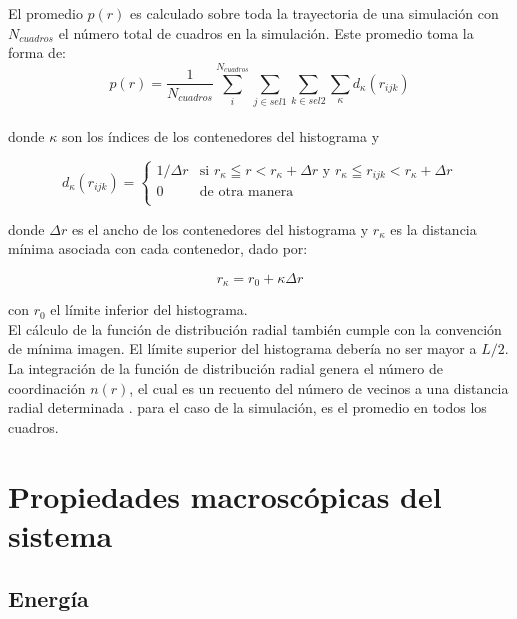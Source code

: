 El promedio $p(r)$ es calculado sobre toda la trayectoria de una simulación con $N_{cuadros}$ el número total de cuadros en la simulación. Este promedio toma la forma de:\\

\begin{equation}\label{p}
    p(r)=\frac{1}{N_{cuadros}}\sum^{N_{cuadros}}_i \sum_{j\in sel1} \sum_{k\in sel2} \sum_{\kappa} d_{\kappa}(r_{ijk})
\end{equation}\\

donde $\kappa$ son los índices de los contenedores del histograma y

\begin{equation}
    d_{\kappa}(r_{ijk}) = 
    \begin{cases}
        1 / \Delta r &\text{si $r_\kappa \leqq r<r_\kappa + \Delta r$ y $r_\kappa \leqq r_{ijk}<r_\kappa + \Delta r$}\\
        0 & \text{de otra manera}\\
    \end{cases}
\end{equation}

donde $\Delta r$ es el ancho de los contenedores del histograma y $r_\kappa$ es la distancia mínima asociada con cada contenedor, dado por:

\begin{equation}
    r_\kappa = r_0 + \kappa \Delta r
\end{equation}

con $r_0$ el límite inferior del histograma.\\

El cálculo de la función de distribución radial también cumple con la convención de mínima imagen. El límite superior del histograma debería no ser mayor a $L/2$.\\

La integración de la función de distribución radial genera el número de coordinación $n(r)$, el cual es un recuento del número de vecinos a una distancia radial determinada \cite{GOCHENOUR201841}. para el caso de la simulación, es el promedio en todos los cuadros.\\

\section{Propiedades macroscópicas del sistema}

\subsection{Energía}

